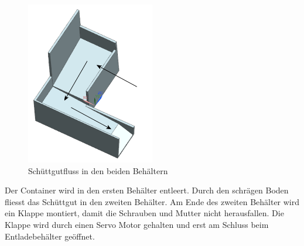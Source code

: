 \begin{figure}[H]
\centering
\includegraphics[width=0.5\textwidth]{03_Loesungskonzept/pictures/behaelter.png}
\caption{Schüttgutfluss in den beiden Behältern}
\end{figure}\flushleft
Der Container wird in den ersten Behälter entleert. Durch den schrägen Boden fliesst das Schüttgut in den zweiten Behälter. Am Ende des zweiten Behälter wird ein Klappe montiert, damit die Schrauben und Mutter nicht herausfallen. Die Klappe wird durch einen Servo Motor gehalten und erst am Schluss beim Entladebehälter geöffnet.\\[0.2cm]

